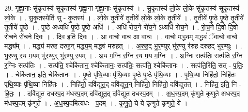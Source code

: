 \documentclass[17pt]{extarticle}
\begin{document}
29. गृ॒ह्णा॒नाः सु॑कृ॒तस्य॑ सुकृ॒तस्य॑ गृह्णा॒ना गृ॑ह्णा॒नाः सु॑कृ॒तस्य॑ । . सु॒कृ॒तस्य॑ लो॒के लो॒के सु॑कृ॒तस्य॑ सुकृ॒तस्य॑ लो॒के । . सु॒कृ॒तस्येति॑ सु - कृ॒तस्य॑ । . लो॒के तृ॒तीये॑ तृ॒तीये॑ लो॒के लो॒के तृ॒तीये᳚ । . तृ॒तीये॑ पृ॒ष्ठे पृ॒ष्ठे तृ॒तीये॑ तृ॒तीये॑ पृ॒ष्ठे । . पृ॒ष्ठे अध्यधि॑ पृ॒ष्ठे पृ॒ष्ठे अधि॑ । . अधि॑ रोच॒ने रो॑च॒ने ऽध्यधि॑ रोच॒ने । . रो॒च॒ने दि॒वो दि॒वो रो॑च॒ने रो॑च॒ने दि॒वः । . दि॒व इति॑ दि॒वः । . आ वा॒चो वा॒च आ वा॒चः । . वा॒चो मद्ध्य॒म् मद्ध्यं॑ ॅवा॒चो वा॒चो मद्ध्य᳚म् । . मद्ध्य॑ मरुह दरुह॒न् मद्ध्य॒म् मद्ध्य॑ मरुहत् । . अ॒रु॒ह॒द् भु॒र॒ण्युर् भु॑र॒ण्यु र॑रुह दरुहद् भुर॒ण्युः । . भु॒र॒ण्यु र॒य म॒यम् भु॑र॒ण्युर् भु॑र॒ण्यु र॒यम् । . अ॒य म॒ग्नि र॒ग्नि र॒य म॒य म॒ग्निः । . अ॒ग्निः सत्प॑तिः॒ सत्प॑ति र॒ग्नि र॒ग्निः सत्प॑तिः । . सत्प॑ति॒ श्चेकि॑तान॒ श्चेकि॑तानः॒ सत्प॑तिः॒ सत्प॑ति॒ श्चेकि॑तानः । . सत्प॑ति॒रिति॒ सत् - प॒तिः॒ । . चेकि॑तान॒ इति॒ चेकि॑तानः । . पृ॒ष्ठे पृ॑थि॒व्याः पृ॑थि॒व्याः पृ॒ष्ठे पृ॒ष्ठे पृ॑थि॒व्याः । . पृ॒थि॒व्या निहि॑तो॒ निहि॑तः पृथि॒व्याः पृ॑थि॒व्या निहि॑तः । . निहि॑तो॒ दवि॑द्युत॒द् दवि॑द्युत॒न् निहि॑तो॒ निहि॑तो॒ दवि॑द्युतत् । . निहि॑त॒ इति॒ नि - हि॒तः॒ । . दवि॑द्युत दधस्प॒द म॑धस्प॒दम् दवि॑द्युत॒द् दवि॑द्युत दधस्प॒दम् । . अ॒ध॒स्प॒दम् कृ॑णुते कृणुते अधस्प॒द म॑धस्प॒दम् कृ॑णुते । . अ॒ध॒स्प॒दमित्य॑धः - प॒दम् । . कृ॒णु॒ते॒ ये ये कृ॑णुते कृणुते॒ ये । \newline
\end{document}
